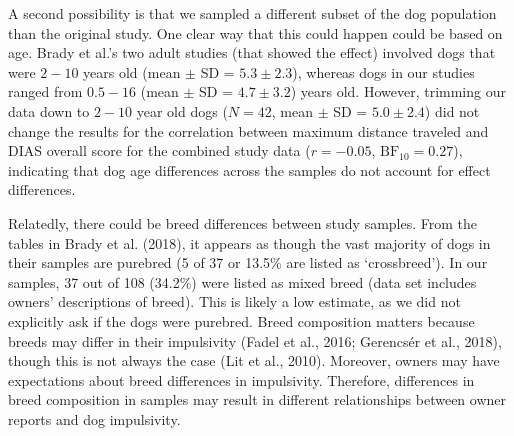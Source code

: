 \documentclass[
  pub,floatsintext]{apa6}
\begin{document}
A second possibility is that we sampled a different subset of the dog population than the original study. One clear way that this could happen could be based on age. Brady et al.'s two adult studies (that showed the effect) involved dogs that were \(2-10\) years old (mean \(\pm\) SD = \(5.3 \pm 2.3\)), whereas dogs in our studies ranged from \(0.5-16\) (mean \(\pm\) SD = \(4.7 \pm 3.2\)) years old. However, trimming our data down to \(2-10\) year old dogs (\(N = 42\), mean \(\pm\) SD = \(5.0 \pm 2.4\)) did not change the results for the correlation between maximum distance traveled and DIAS overall score for the combined study data (\(r = -0.05\), \(\mathrm{BF}_{\textrm{10}} = 0.27\)), indicating that dog age differences across the samples do not account for effect differences.

Relatedly, there could be breed differences between study samples. From the tables in Brady et al. (2018), it appears as though the vast majority of dogs in their samples are purebred (5 of 37 or 13.5\% are listed as `crossbreed'). In our samples, 37 out of 108 (34.2\%) were listed as mixed breed (data set includes owners' descriptions of breed). This is likely a low estimate, as we did not explicitly ask if the dogs were purebred. Breed composition matters because breeds may differ in their impulsivity (Fadel et al., 2016; Gerencsér et al., 2018), though this is not always the case (Lit et al., 2010). Moreover, owners may have expectations about breed differences in impulsivity. Therefore, differences in breed composition in samples may result in different relationships between owner reports and dog impulsivity.
\end{document}

